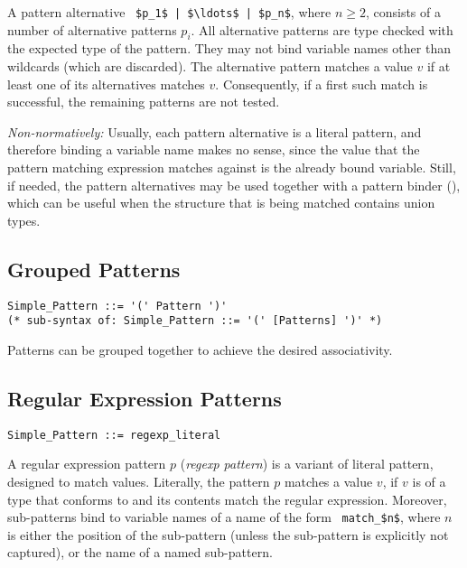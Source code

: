 A pattern alternative ~\lstinline!$p_1$ | $\ldots$ | $p_n$!, where $n \geq 2$, consists of a number of alternative patterns $p_i$. All alternative patterns are type checked with the expected type of the pattern. They may not bind variable names other than wildcards (which are discarded). The alternative pattern matches a value $v$ if at least one of its alternatives matches $v$. Consequently, if a first such match is successful, the remaining patterns are not tested.

{\em Non-normatively:} Usually, each pattern alternative is a literal pattern, and therefore binding a variable name makes no sense, since the value that the pattern matching expression matches against is the already bound variable. Still, if needed, the pattern alternatives may be used together with a pattern binder (), which can be useful when the structure that is being matched contains union types. 





\subsection{Grouped Patterns}
\label{sec:grouped-patterns}

\syntax\begin{lstlisting}
Simple_Pattern ::= '(' Pattern ')'
(* sub-syntax of: Simple_Pattern ::= '(' [Patterns] ')' *)
\end{lstlisting}

Patterns can be grouped together to achieve the desired associativity. 






\subsection{Regular Expression Patterns}
\label{sec:regexp-patterns}

\syntax\begin{lstlisting}
Simple_Pattern ::= regexp_literal
\end{lstlisting}

A regular expression pattern $p$ ({\em regexp pattern}) is a variant of literal pattern, designed to match  values. Literally, the pattern $p $ matches a value $v$, if $v$ is of a type that conforms to  and its contents match the regular expression. Moreover, sub-patterns bind to variable names of a name of the form ~\lstinline!match_$n$!, where $n$ is either the position of the sub-pattern (unless the sub-pattern is explicitly not captured), or the name of a named sub-pattern. 


